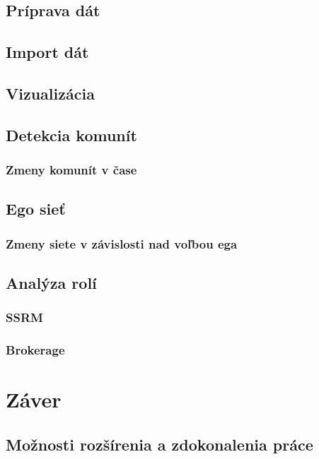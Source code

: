 \documentclass[slovak,master,public,dept460,male,cpdeclaration,oneside]{diploma}
\begin{document}
\subsection{Príprava dát}


\subsection{Import dát}


\subsection{Vizualizácia}


\subsection{Detekcia komunít}
\subsubsection{Zmeny komunít v čase}

\subsection{Ego sieť}
\subsubsection{Zmeny siete v závislosti nad voľbou ega}


\subsection{Analýza rolí}
\subsubsection{SSRM}
\subsubsection{Brokerage}





\section{Záver}



\subsection{Možnosti rozšírenia a zdokonalenia práce}
\end{document}
